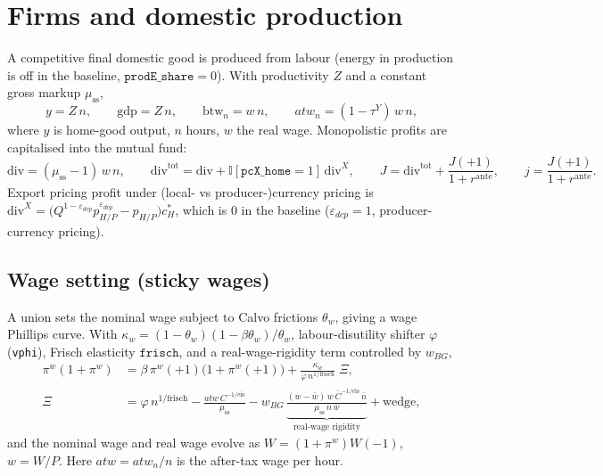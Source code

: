 \documentclass[11pt]{article}
\newcommand{\I}{\mathbb{I}}
\newcommand{\stst}{\mathrm{ss}}
\begin{document}
\section{Firms and domestic production}\label{sec:firms}

A competitive final domestic good is produced from labour (energy in production
is off in the baseline, $\texttt{prodE\_share}=0$). With productivity $Z$ and a
constant gross markup $\mu_{\stst}$,
\begin{equation}
y = Z\,n,\qquad
\mathrm{gdp}=Z\,n,\qquad
\text{btw}_n = w\,n,\qquad
atw_n = (1-\tau^{Y})\,w\,n,
\end{equation}
where $y$ is home-good output, $n$ hours, $w$ the real wage. Monopolistic
profits are capitalised into the mutual fund:
\begin{equation}
\mathrm{div}=(\mu_{\stst}-1)\,w\,n,\qquad
\mathrm{div}^{\text{tot}}=\mathrm{div}+\I[\texttt{pcX\_home}=1]\,\mathrm{div}^{X},\qquad
J=\mathrm{div}^{\text{tot}}+\frac{J(+1)}{1+r^{\text{ante}}},\qquad
j=\frac{J(+1)}{1+r^{\text{ante}}}.
\end{equation}
Export pricing profit under (local- vs producer-)currency pricing is
$\mathrm{div}^{X}=\bigl(Q^{1-\varepsilon_{dcp}}p_{H/P}^{\varepsilon_{dcp}}-p_{H/P}\bigr)c_H^{*}$,
which is $0$ in the baseline ($\varepsilon_{dcp}=1$, producer-currency pricing).

\subsection{Wage setting (sticky wages)}\label{sec:union}

A union sets the nominal wage subject to Calvo frictions $\theta_w$, giving a
wage Phillips curve. With $\kappa_w=(1-\theta_w)(1-\beta\theta_w)/\theta_w$,
labour-disutility shifter $\varphi$ (\texttt{vphi}), Frisch elasticity
$\texttt{frisch}$, and a real-wage-rigidity term controlled by $w_{BG}$,
\begin{align}
\pi^{w}(1+\pi^{w})
&=\beta\,\pi^{w}(+1)\bigl(1+\pi^{w}(+1)\bigr)
+\frac{\kappa_w}{\varphi\,n^{1/\text{frisch}}}\;\Xi,\\
\Xi &= \varphi\,n^{1/\text{frisch}}
-\frac{atw\,C^{-1/\text{eis}}}{\mu_{\stst}}
- w_{BG}\,\underbrace{\frac{(w-\bar w)\,w\,\bar C^{-1/\text{eis}}\,\bar n}{\mu_{\stst}\,n\,\bar w}}_{\text{real-wage rigidity}}
+ \text{wedge},
\end{align}
and the nominal wage and real wage evolve as
$W=(1+\pi^{w})W(-1)$, $w=W/P$. Here $atw=atw_n/n$ is the after-tax wage per hour.
\end{document}
